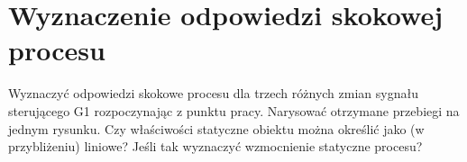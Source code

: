 \section{Wyznaczenie odpowiedzi skokowej procesu}
Wyznaczyć odpowiedzi skokowe procesu dla trzech różnych zmian sygnału sterującego
G1 rozpoczynając z punktu pracy. Narysować otrzymane przebiegi na jednym rysunku.
Czy właściwości statyczne obiektu można określić jako (w przybliżeniu) liniowe? Jeśli
tak wyznaczyć wzmocnienie statyczne procesu?
